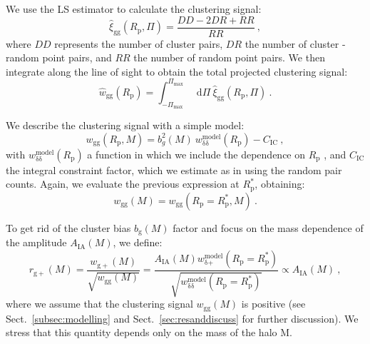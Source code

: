 \documentclass[a4paper,fleqn,usenatbib]{mnras}
\newcommand*\dif{\mathop{}\!\mathrm{d}} 	%
\begin{document}
We use the LS \citep{LandySzalay1993} estimator to calculate the clustering signal:
\begin{equation}
    \hat{\xi}_{\mathrm{gg}}(R_{\mathrm{p}}, \Pi) = \frac{DD -2DR + RR}{RR} \ ,
	\label{eq:xigghat}
\end{equation}
where $DD$ represents the number of cluster pairs, $DR$ the number of cluster - random point pairs, and $RR$ the number of random point pairs. We then integrate along the line of sight to obtain the total projected clustering signal:
\begin{equation}
   \hat{w}_{\mathrm{gg}} (R_{\mathrm{p}}) = \int _{-\Pi_{\mathrm{max}}}^{\Pi_{\mathrm{max}}} \dif \Pi \ \hat{\xi}_{\mathrm{gg}}(R_{\mathrm{p}}, \Pi) \ .
	\label{eq:wgghat}
\end{equation}

We describe the clustering signal with a simple model:
\begin{equation}
    w_{\mathrm{gg}} (R_{\mathrm{p}}, M)=b_g^2 (M)\ w_{\mathrm{\delta} \mathrm{\delta}}^{\mathrm{model}} (R_{\mathrm{p}}) - C_{\mathrm{IC}} \ , 
	\label{eq:wgg}
\end{equation}
with $w_{\mathrm{\delta} \mathrm{\delta}}^{\mathrm{model}} (R_{\mathrm{p}})$ a function in which we include the dependence on $R_{\mathrm{p}}$ \citep[equation 9]{vanUitertJoachimi2017}, and $C_{\mathrm{IC}}$ the integral constraint factor, which we estimate as in \citet[equation 8]{RocheEales1999} using the random pair counts. Again, we evaluate the previous expression at $R_{\mathrm{p}}^*$, obtaining:
\begin{equation}
    w_{\mathrm{gg}} (M)= w_{\mathrm{gg}} (R_{\mathrm{p}} = R_{\mathrm{p}}^*, M) \ .
	\label{eq:wgpmass}
\end{equation}

To get rid of the cluster bias $b_{\mathrm{g}} (M)$ factor and focus on the mass dependence of the amplitude $A_{\mathrm{IA}} (M)$, we define:
\begin{equation}
    r_{\mathrm{g+}} (M)=\frac{w_{\mathrm{g+}} (M)}{\sqrt{w_{\mathrm{gg}} (M)}} =\frac{A_{\mathrm{IA}} (M) w_{\mathrm{\delta} \mathrm{+}}^{\mathrm{model}} (R_{\mathrm{p}} = R_{\mathrm{p}}^*) }{\sqrt{w_{\mathrm{\delta} \mathrm{\delta}}^{\mathrm{model}} (R_{\mathrm{p}}=R_{\mathrm{p}}^*)}} \propto A_{\mathrm{IA}} (M) \ ,
	\label{eq:rg+}
\end{equation}
where we assume that the clustering signal $w_{\mathrm{gg}}(M)$ is positive (see Sect.~\ref{subsec:modelling} and Sect.~\ref{sec:resanddiscuss} for further discussion). We stress that this quantity depends only on the mass of the halo M.
\end{document}
